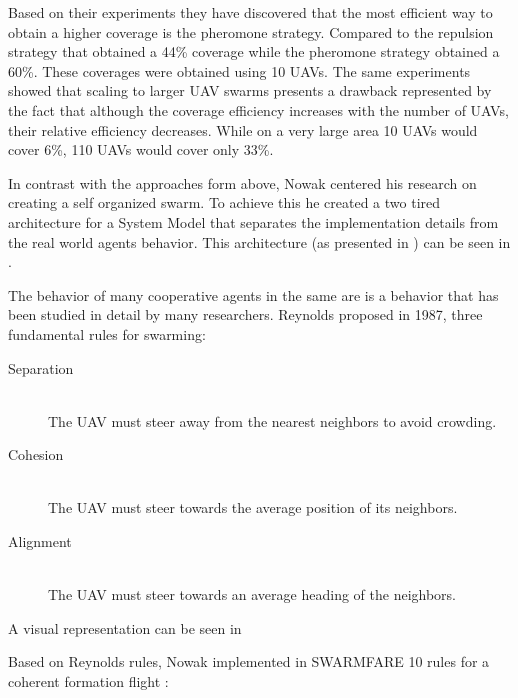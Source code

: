 Based on their experiments they have discovered that the most efficient way to
obtain a higher coverage is the pheromone strategy. Compared to the repulsion 
strategy that obtained a 44\% coverage while the pheromone strategy obtained a 
60\%. These coverages were obtained using 10 UAVs. The same experiments showed
that scaling to larger UAV swarms presents a drawback represented by the fact
that although the coverage efficiency increases with the number of UAVs,  
their relative efficiency decreases. While on a very large area 10 UAVs would
cover 6\%,  110 UAVs would cover only 33\%.

In contrast with the approaches form above,  Nowak centered his research on 
creating a self organized swarm. To achieve this he created a two tired architecture
for a  System Model that separates the implementation 
details from the real world agents behavior. This architecture (as presented in
  \cite{so}) can be seen in  .

\newpage

The behavior of many cooperative agents in the same are is a behavior that
has been studied in detail by many researchers. Reynolds proposed in 1987, 
three fundamental rules for swarming: \cite{swarmrules}

\begin{description}
\item [Separation] \hfill \\ The UAV must steer away from the nearest neighbors to avoid crowding.
\item [Cohesion] \hfill \\ The UAV must steer towards the average position of its neighbors.
\item [Alignment] \hfill \\ The UAV must steer towards an average heading of the neighbors.
\end{description}

A visual representation can be seen in 


Based on Reynolds rules, Nowak implemented in SWARMFARE 10 rules for a coherent
formation flight \cite{so}:

